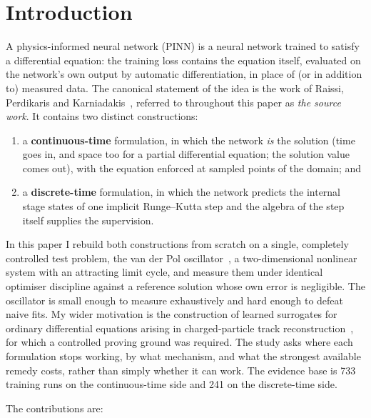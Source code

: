 \documentclass[11pt,a4paper]{article}
\begin{document}
\tableofcontents

\section{Introduction}
\label{sec:intro}

A physics-informed neural network (PINN) is a neural network trained to
satisfy a differential equation: the training loss contains the equation
itself, evaluated on the network's own output by automatic differentiation,
in place of (or in addition to) measured data. The canonical statement of
the idea is the work of Raissi, Perdikaris and
Karniadakis~\cite{raissi2019}, referred to throughout this paper as
\emph{the source work}. It contains two distinct constructions:

\begin{enumerate}
  \item a \textbf{continuous-time} formulation, in which the network
  \emph{is} the solution (time goes in, and space too for a partial
  differential equation; the solution value comes out), with the equation
  enforced at sampled points of the domain; and
  \item a \textbf{discrete-time} formulation, in which the network predicts
  the internal stage states of one implicit Runge--Kutta step and the
  algebra of the step itself supplies the supervision.
\end{enumerate}

In this paper I rebuild both constructions from scratch on a single,
completely controlled test problem, the van der Pol
oscillator~\cite{vanderpol1926}, a two-dimensional nonlinear system with an
attracting limit cycle, and measure them under identical optimiser
discipline against a reference solution whose own error is negligible. The
oscillator is small enough to measure exhaustively and hard enough to
defeat naive fits. My wider motivation is the construction of learned
surrogates for ordinary differential equations arising in charged-particle
track reconstruction~\cite{aaij2020}, for which a controlled proving ground
was required. The study asks where each formulation stops working, by what
mechanism, and what the strongest available remedy costs, rather than
simply whether it can work. The evidence base is 733 training runs on the
continuous-time side and 241 on the discrete-time side.

The contributions are:
\end{document}
